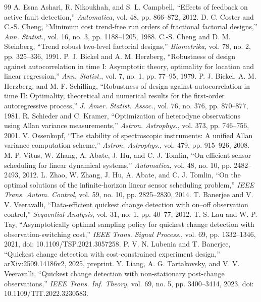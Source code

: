 \begin{thebibliography}{99}
 A. Esna Ashari, R. Nikoukhah, and S. L. Campbell, ``Effects of feedback on active fault detection,'' \emph{Automatica}, vol. 48, pp. 866--872, 2012.
 D. C. Coster and C.-S. Cheng, ``Minimum cost trend-free run orders of fractional factorial designs,'' \emph{Ann. Statist.}, vol. 16, no. 3, pp. 1188--1205, 1988.
 C.-S. Cheng and D. M. Steinberg, ``Trend robust two-level factorial designs,'' \emph{Biometrika}, vol. 78, no. 2, pp. 325--336, 1991.
 P. J. Bickel and A. M. Herzberg, ``Robustness of design against autocorrelation in time I: Asymptotic theory, optimality for location and linear regression,'' \emph{Ann. Statist.}, vol. 7, no. 1, pp. 77--95, 1979.
 P. J. Bickel, A. M. Herzberg, and M. F. Schilling, ``Robustness of design against autocorrelation in time II: Optimality, theoretical and numerical results for the first-order autoregressive process,'' \emph{J. Amer. Statist. Assoc.}, vol. 76, no. 376, pp. 870--877, 1981.
 R. Schieder and C. Kramer, ``Optimization of heterodyne observations using Allan variance measurements,'' \emph{Astron. Astrophys.}, vol. 373, pp. 746--756, 2001.
 V. Ossenkopf, ``The stability of spectroscopic instruments: A unified Allan variance computation scheme,'' \emph{Astron. Astrophys.}, vol. 479, pp. 915--926, 2008.
 M. P. Vitus, W. Zhang, A. Abate, J. Hu, and C. J. Tomlin, ``On efficient sensor scheduling for linear dynamical systems,'' \emph{Automatica}, vol. 48, no. 10, pp. 2482--2493, 2012.
 L. Zhao, W. Zhang, J. Hu, A. Abate, and C. J. Tomlin, ``On the optimal solutions of the infinite-horizon linear sensor scheduling problem,'' \emph{IEEE Trans. Autom. Control}, vol. 59, no. 10, pp. 2825--2830, 2014.
 T. Banerjee and V. V. Veeravalli, ``Data-efficient quickest change detection with on--off observation control,'' \emph{Sequential Analysis}, vol. 31, no. 1, pp. 40--77, 2012.
 T. S. Lau and W. P. Tay, ``Asymptotically optimal sampling policy for quickest change detection with observation-switching cost,'' \emph{IEEE Trans. Signal Process.}, vol. 69, pp. 1332--1346, 2021, doi: 10.1109/TSP.2021.3057258.
 P. V. N. Lubenia and T. Banerjee, ``Quickest change detection with cost-constrained experiment design,'' arXiv:2509.14186v2, 2025, preprint.
 Y. Liang, A. G. Tartakovsky, and V. V. Veeravalli, ``Quickest change detection with non-stationary post-change observations,'' \emph{IEEE Trans. Inf. Theory}, vol. 69, no. 5, pp. 3400--3414, 2023, doi: 10.1109/TIT.2022.3230583.

\end{thebibliography}
